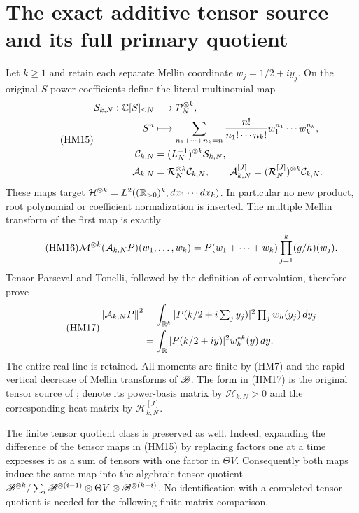 \documentclass[11pt]{article}
\begin{document}
\section{The exact additive tensor source and its full primary quotient}
Let $k\ge1$ and retain each separate Mellin coordinate $w_j=1/2+iy_j$.
On the original $S$-power coefficients define the literal multinomial map
\begin{equation}\tag{HM15}
 \begin{aligned}
 \mathcal S_{k,N}:\mathbb C[S]_{\le N}&\longrightarrow\mathcal P_N^{\otimes k},\\
 S^n&\longmapsto
 \sum_{n_1+\cdots+n_k=n}\frac{n!}{n_1!\cdots n_k!}
                     w_1^{n_1}\cdots w_k^{n_k},\\
 \mathcal C_{k,N}&=(L_N^{-1})^{\otimes k}\mathcal S_{k,N},\\
 \mathcal A_{k,N}&=\mathcal R_N^{\otimes k}\mathcal C_{k,N},\qquad
 \mathcal A_{k,N}^{[J]}=(\mathcal R_N^{[J]})^{\otimes k}\mathcal C_{k,N}.
 \end{aligned}
\end{equation}
These maps target $\mathcal H^{\otimes k}=L^2((\mathbb R_{>0})^k,dx_1\cdots dx_k)$.
In particular no new product, root polynomial or coefficient normalization
is inserted. The multiple Mellin transform of the first map is exactly
\begin{equation}\tag{HM16}
 \mathcal M^{\otimes k}(\mathcal A_{k,N}P)(w_1,\ldots,w_k)
       =P(w_1+\cdots+w_k)\prod_{j=1}^k(g/h)(w_j).
\end{equation}
Tensor Parseval and Tonelli, followed by the definition of convolution,
therefore prove
\begin{equation}\tag{HM17}
 \begin{aligned}
 \left\lVert\mathcal A_{k,N}P\right\rVert^2
 &=\int_{\mathbb R^k}|P(k/2+i\textstyle\sum_jy_j)|^2
                                  \prod_j w_h(y_j)\,dy_j\\
 &=\int_\mathbb R|P(k/2+iy)|^2w_h^{*k}(y)\,dy.
 \end{aligned}
\end{equation}
The entire real line is retained. All moments are finite by (HM7) and
the rapid vertical decrease of Mellin transforms of $\mathscr B$. The form in
(HM17) is the original tensor source of \cite{hm2:fullwindow}; denote its
power-basis matrix by $\mathcal H_{k,N}>0$ and the corresponding heat
matrix by $\mathcal H_{k,N}^{[J]}$.

The finite tensor quotient class is preserved as well. Indeed, expanding
the difference of the tensor maps in (HM15) by replacing factors one at
a time expresses it as a sum of tensors with one factor in $\Theta V$.
Consequently both maps induce the same map into the algebraic tensor
quotient $\mathscr B^{\otimes k}/\sum_i\mathscr B^{\otimes(i-1)}\otimes\Theta V
\otimes\mathscr B^{\otimes(k-i)}$. No identification with a completed tensor
quotient is needed for the following finite matrix comparison.
\end{document}
